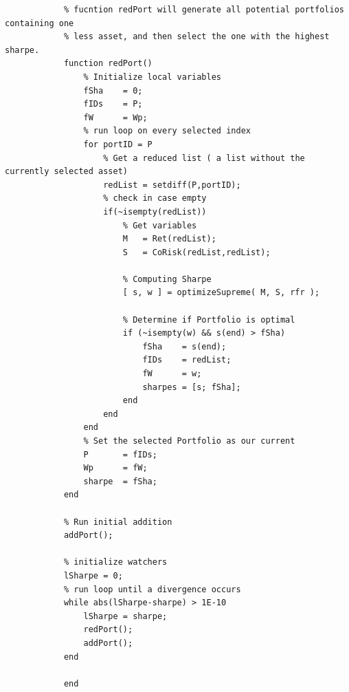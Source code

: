 \documentclass[12pt,titlepage,letter]{article}
\begin{document}
\begin{lstlisting}
			% fucntion redPort will generate all potential portfolios containing one
			% less asset, and then select the one with the highest sharpe.
			function redPort()
			    % Initialize local variables
			    fSha    = 0;
			    fIDs    = P;
			    fW      = Wp;
			    % run loop on every selected index
			    for portID = P
			        % Get a reduced list ( a list without the currently selected asset)
			        redList = setdiff(P,portID);
			        % check in case empty
			        if(~isempty(redList))
			            % Get variables
			            M   = Ret(redList);
			            S   = CoRisk(redList,redList);

			            % Computing Sharpe
			            [ s, w ] = optimizeSupreme( M, S, rfr );

			            % Determine if Portfolio is optimal
			            if (~isempty(w) && s(end) > fSha)
			                fSha    = s(end);
			                fIDs    = redList;
			                fW      = w;
			                sharpes = [s; fSha];
			            end
			        end
			    end
			    % Set the selected Portfolio as our current
			    P       = fIDs;
			    Wp      = fW;
			    sharpe  = fSha;
			end

			% Run initial addition
			addPort();

			% initialize watchers
			lSharpe = 0;
			% run loop until a divergence occurs
			while abs(lSharpe-sharpe) > 1E-10
			    lSharpe = sharpe;
			    redPort();
			    addPort();
			end

			end
		\end{lstlisting}
\end{document}

